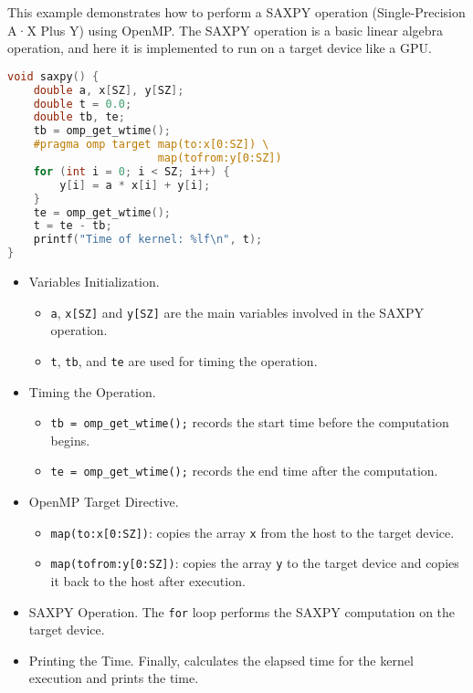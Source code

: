 \newpage

\begin{examplebox}
    This example demonstrates how to perform a SAXPY operation (Single-Precision A·X Plus Y) using OpenMP. The SAXPY operation is a basic linear algebra operation, and here it is implemented to run on a target device like a GPU.
    
    \begin{lstlisting}[language=C++]
void saxpy() {
    double a, x[SZ], y[SZ];
    double t = 0.0;
    double tb, te;
    tb = omp_get_wtime();
    #pragma omp target map(to:x[0:SZ]) \
                       map(tofrom:y[0:SZ])
    for (int i = 0; i < SZ; i++) {
        y[i] = a * x[i] + y[i];
    }
    te = omp_get_wtime();
    t = te - tb;
    printf("Time of kernel: %lf\n", t);
}\end{lstlisting}

    \begin{itemize}
        \item Variables Initialization.
        \begin{itemize}
            \item \texttt{a}, \texttt{x[SZ]} and \texttt{y[SZ]} are the main variables involved in the SAXPY operation.
            \item \texttt{t}, \texttt{tb}, and \texttt{te} are used for timing the operation.
        \end{itemize}

        \item Timing the Operation.
        \begin{itemize}
            \item \texttt{tb = omp\_get\_wtime();} records the start time before the computation begins.
            \item \texttt{te = omp\_get\_wtime();} records the end time after the computation.
        \end{itemize}

        \item OpenMP Target Directive.
        \begin{itemize}
            \item \texttt{map(to:x[0:SZ])}: copies the array \texttt{x} from the host to the target device.
            \item \texttt{map(tofrom:y[0:SZ])}: copies the array \texttt{y} to the target device and copies it back to the host after execution.
        \end{itemize}

        \item SAXPY Operation. The \texttt{for} loop performs the SAXPY computation on the target device.

        \item Printing the Time. Finally, calculates the elapsed time for the kernel execution and prints the time.
    \end{itemize}
\end{examplebox}
